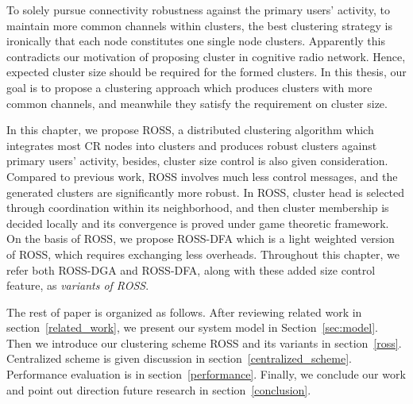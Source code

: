 
To solely pursue connectivity robustness against the primary users' activity, \ie to maintain more common channels within clusters, the best clustering strategy is ironically that each node constitutes one single node clusters.
Apparently this contradicts our motivation of proposing cluster in cognitive radio network.
Hence, expected cluster size should be required for the formed clusters.
In this thesis, our goal is to propose a clustering approach which produces clusters with more common channels, and meanwhile they satisfy the requirement on cluster size.

In this chapter, we propose ROSS, a distributed clustering algorithm which integrates most CR nodes into clusters and produces robust clusters against primary users' activity, besides, cluster size control is also given consideration.
Compared to previous work, ROSS involves much less control messages, and the generated clusters are significantly more robust.
In ROSS, cluster head is selected through coordination within its neighborhood, and then cluster membership is decided locally and its convergence is proved under game theoretic framework. 
On the basis of ROSS, we propose ROSS-DFA which is a light weighted version of ROSS, which requires exchanging less overheads.
Throughout this chapter, we refer both ROSS-DGA and ROSS-DFA, along with these added size control feature, as \textit{variants of ROSS}. 

The rest of paper is organized as follows. 
After reviewing related work in section~\ref{related_work}, we present our system model in Section~\ref{sec:model}. 
Then we introduce our clustering scheme ROSS and its variants in section~\ref{ross}.
Centralized scheme is given discussion in section~\ref{centralized_scheme}.
Performance evaluation is in section~\ref{performance}.
Finally, we conclude our work and point out direction future research in section~\ref{conclusion}.


